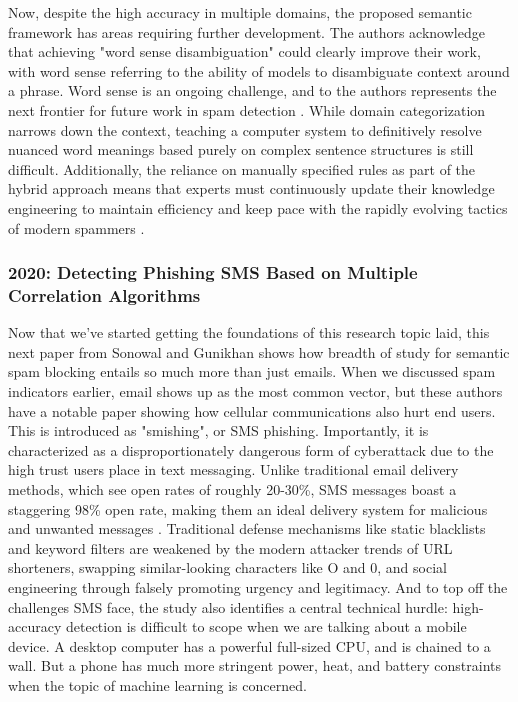 \documentclass[conference]{IEEEtran}
\begin{document}
Now, despite the high accuracy in multiple domains, the proposed semantic framework has areas requiring further development.
The authors acknowledge that achieving "word sense disambiguation" could clearly improve their work, with word sense referring to the ability of models to disambiguate context around a phrase.
Word sense is an ongoing challenge, and to the authors represents the next frontier for future work in spam detection \cite{saidani1}.
While domain categorization narrows down the context, teaching a computer system to definitively resolve nuanced word meanings based purely on complex sentence structures is still difficult.
Additionally, the reliance on manually specified rules as part of the hybrid approach means that experts must continuously update their knowledge engineering to maintain efficiency and keep pace with the rapidly evolving tactics of modern spammers \cite{saidani1}.

\subsubsection{2020: Detecting Phishing SMS Based on Multiple Correlation Algorithms}
Now that we've started getting the foundations of this research topic laid, this next paper from Sonowal and Gunikhan shows how breadth of study for semantic spam blocking entails so much more than just emails.
When we discussed spam indicators earlier, email shows up as the most common vector, but these authors have a notable paper showing how cellular communications also hurt end users.
This is introduced as "smishing", or SMS phishing.
Importantly, it is characterized as a disproportionately dangerous form of cyberattack due to the high trust users place in text messaging.
Unlike traditional email delivery methods, which see open rates of roughly 20-30\%, SMS messages boast a staggering 98\% open rate, making them an ideal delivery system for malicious and unwanted messages \cite{sonowal1}.
Traditional defense mechanisms like static blacklists and keyword filters are weakened by the modern attacker trends of URL shorteners, swapping similar-looking characters like O and 0, and social engineering through falsely promoting urgency and legitimacy.
And to top off the challenges SMS face, the study also identifies a central technical hurdle: high-accuracy detection is difficult to scope when we are talking about a mobile device.
A desktop computer has a powerful full-sized CPU, and is chained to a wall. But a phone has much more stringent power, heat, and battery constraints when the topic of machine learning is concerned\cite{sonowal1}.
\end{document}
